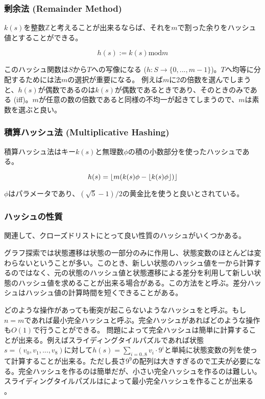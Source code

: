\subsubsection{剰余法 (Remainder Method)}

$k(s)$を整数$\mathbb{Z}$と考えることが出来るならば、それを$m$で割った余りをハッシュ値とすることができる。

\begin{equation}
  h(s) := k(s) \text{mod} m
\end{equation}
  
このハッシュ関数は$S$から$T$への写像になる ($h: S \rightarrow \{0, ..., m-1\}$)。$T$へ均等に分配するためには法$m$の選択が重要になる。
例えば$m$に2の倍数を選んでしまうと、$h(s)$が偶数であるのは$k(s)$が偶数であるときであり、そのときのみである (iff)。$m$が任意の数の倍数であると同様の不均一が起きてしまうので、$m$は素数を選ぶと良い。


\subsubsection{積算ハッシュ法 (Multiplicative Hashing)}
積算ハッシュ法はキー$k(s)$と無理数$\phi$の積の小数部分を使ったハッシュである。

\begin{equation}
	h(s) = \lfloor m (k(s) \phi - \lfloor k(s) \phi\rfloor)\rfloor
\end{equation}

$\phi$はパラメータであり、$(\sqrt{5} - 1) / 2$の黄金比を使うと良いとされている。

\subsubsection{ハッシュの性質}

関連して、クローズドリストにとって良い性質のハッシュがいくつかある。

グラフ探索では状態遷移は状態の一部分のみに作用し、状態変数のほとんどは変わらないということが多い。このとき、新しい状態のハッシュ値を一から計算するのではなく、元の状態のハッシュ値と状態遷移による差分を利用して新しい状態のハッシュ値を求めることが出来る場合がある。この方法をと呼ぶ。差分ハッシュはハッシュ値の計算時間を短くできることがある。

どのような操作があっても衝突が起こらないようなハッシュをと呼ぶ。もし$n = m$であれば最小完全ハッシュと呼ぶ。完全ハッシュがあればどのような操作も$O(1)$で行うことができる。
問題によって完全ハッシュは簡単に計算することが出来る。例えばスライディングタイルパズルであれば状態$s = (v_0, v_1,...,v_8)$に対して$h(s) = \sum_{i = 0..8} v_i \cdot 9^i$と単純に状態変数の列を使って計算することが出来る。ただし長さ$9^9$の配列は大きすぎるので工夫が必要になる。完全ハッシュを作るのは簡単だが、小さい完全ハッシュを作るのは難しい。スライディングタイルパズルはによって最小完全ハッシュを作ることが出来る \cite{korf2005large}。


